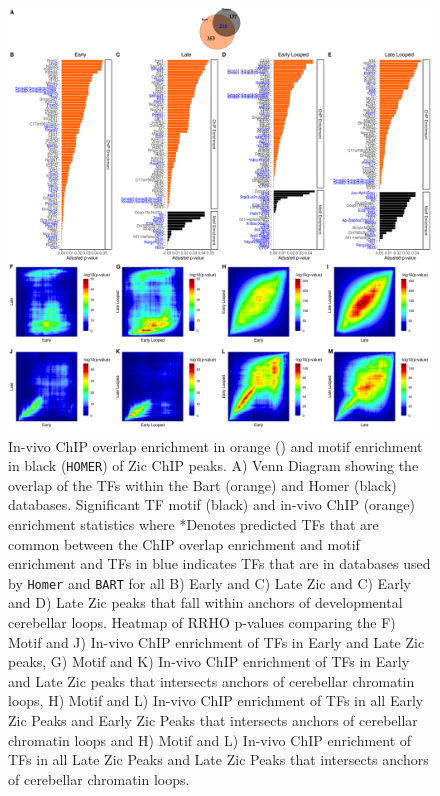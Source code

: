 \documentclass[fleqn,10pt]{wlscirep}
\begin{document}
\begin{figure}[ht]
\centering
\includegraphics[width=.95\textwidth]{../figures/supp_figure2.png}
\caption{In-vivo ChIP overlap enrichment in orange () and motif enrichment in black (\texttt{HOMER}) of Zic ChIP peaks. A) Venn Diagram showing the overlap of the TFs within the Bart (orange) and Homer (black) databases. Significant TF motif (black) and in-vivo ChIP (orange) enrichment statistics where *Denotes predicted TFs that are common between the ChIP overlap enrichment and motif enrichment and TFs in blue indicates TFs that are in databases used by \texttt{Homer} and \texttt{BART} for all B) Early and C) Late Zic and C) Early and D) Late Zic peaks that fall within anchors of developmental cerebellar loops. Heatmap of RRHO p-values comparing the F) Motif and J) In-vivo ChIP enrichment of TFs in Early and Late Zic peaks, G) Motif and K) In-vivo ChIP enrichment of TFs in Early and Late Zic peaks that intersects anchors of cerebellar chromatin loops, H) Motif and L) In-vivo ChIP enrichment of TFs in all Early Zic Peaks and Early Zic Peaks that intersects anchors of cerebellar chromatin loops and  H) Motif and L) In-vivo ChIP enrichment of TFs in all Late Zic Peaks and Late Zic Peaks that intersects anchors of cerebellar chromatin loops.}
\label{fig:HomerBart}
\end{figure}
\end{document}
